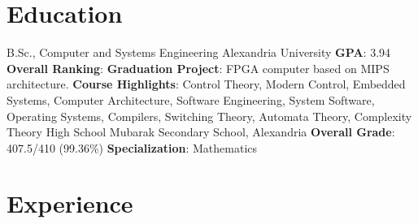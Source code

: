 \documentclass[letterpaper]{twentysecondcv} %
\begin{document}



\makeprofile


\section{Education}

\begin{twenty} %
               {B.Sc., Computer and Systems Engineering}
               {Alexandria University}
               {\textbf{GPA}: 3.94\newline
                \textbf{Overall Ranking}: \underline{}\newline
                \textbf{Graduation Project}: FPGA computer based on MIPS architecture.\newline
                \textbf{Course Highlights}: Control Theory, Modern Control, Embedded Systems,
                                            Computer Architecture, Software Engineering,
                                            System Software, Operating Systems, Compilers, Switching Theory,
                                            Automata Theory, Complexity Theory
               }
               {High School}
               {Mubarak Secondary School, Alexandria}
               {\textbf{Overall Grade}: 407.5/410 (99.36\%)\newline
                \textbf{Specialization}: Mathematics}
\end{twenty}


\section{Experience}
\end{document}
